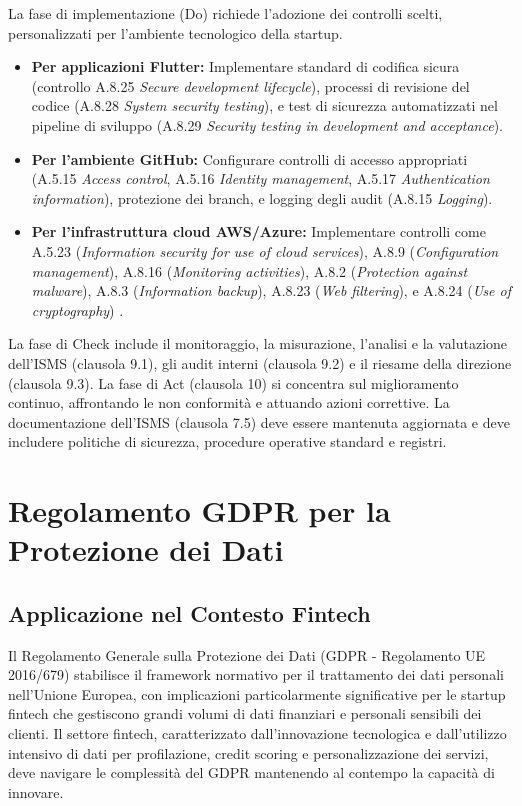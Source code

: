 La fase di implementazione (Do) richiede l'adozione dei controlli scelti, personalizzati per l'ambiente tecnologico della startup.
\begin{itemize}
    \item \textbf{Per applicazioni Flutter:} Implementare standard di codifica sicura (controllo A.8.25 \textit{Secure development lifecycle}), processi di revisione del codice (A.8.28 \textit{System security testing}), e test di sicurezza automatizzati nel pipeline di sviluppo (A.8.29 \textit{Security testing in development and acceptance}).
    \item \textbf{Per l'ambiente GitHub:} Configurare controlli di accesso appropriati (A.5.15 \textit{Access control}, A.5.16 \textit{Identity management}, A.5.17 \textit{Authentication information}), protezione dei branch, e logging degli audit (A.8.15 \textit{Logging}).
    \item \textbf{Per l'infrastruttura cloud AWS/Azure:} Implementare controlli come A.5.23 (\textit{Information security for use of cloud services}), A.8.9 (\textit{Configuration management}), A.8.16 (\textit{Monitoring activities}), A.8.2 (\textit{Protection against malware}), A.8.3 (\textit{Information backup}), A.8.23 (\textit{Web filtering}), e A.8.24 (\textit{Use of cryptography}) .
\end{itemize}
La fase di Check include il monitoraggio, la misurazione, l'analisi e la valutazione dell'ISMS (clausola 9.1), gli audit interni (clausola 9.2) e il riesame della direzione (clausola 9.3). La fase di Act (clausola 10) si concentra sul miglioramento continuo, affrontando le non conformità e attuando azioni correttive. La documentazione dell'ISMS (clausola 7.5) deve essere mantenuta aggiornata e deve includere politiche di sicurezza, procedure operative standard e registri.

\section{Regolamento GDPR per la Protezione dei Dati}
\label{sec:gdpr}

\subsection{Applicazione nel Contesto Fintech}
Il Regolamento Generale sulla Protezione dei Dati (GDPR - Regolamento UE 2016/679) stabilisce il framework normativo per il trattamento dei dati personali nell'Unione Europea, con implicazioni particolarmente significative per le startup fintech che gestiscono grandi volumi di dati finanziari e personali sensibili dei clienti. Il settore fintech, caratterizzato dall'innovazione tecnologica e dall'utilizzo intensivo di dati per profilazione, credit scoring e personalizzazione dei servizi, deve navigare le complessità del GDPR mantenendo al contempo la capacità di innovare.

